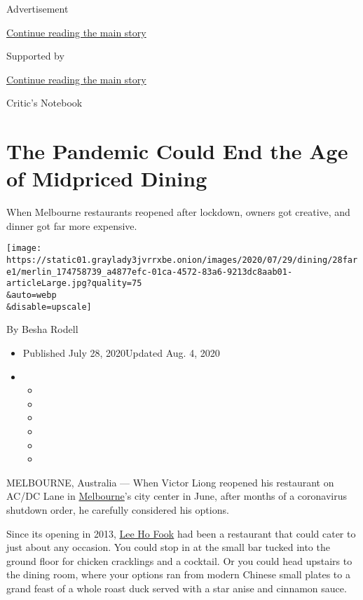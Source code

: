 Advertisement

\protect\hyperlink{after-top}{Continue reading the main story}

Supported by

\protect\hyperlink{after-sponsor}{Continue reading the main story}

Critic's Notebook

\hypertarget{the-pandemic-could-end-the-age-of-midpriced-dining}{%
\section{The Pandemic Could End the Age of Midpriced
Dining}\label{the-pandemic-could-end-the-age-of-midpriced-dining}}

When Melbourne restaurants reopened after lockdown, owners got creative,
and dinner got far more expensive.

\texttt{[image: https://static01.graylady3jvrrxbe.onion/images/2020/07/29/dining/28fare1/merlin\_174758739\_a4877efc-01ca-4572-83a6-9213dc8aab01-articleLarge.jpg?quality=75\\\&auto=webp\\\&disable=upscale]}

By Besha Rodell

\begin{itemize}
\item
  Published July 28, 2020Updated Aug. 4, 2020
\item
  \begin{itemize}
  \item
  \item
  \item
  \item
  \item
  \item
  \end{itemize}
\end{itemize}

MELBOURNE, Australia --- When Victor Liong reopened his restaurant on
AC/DC Lane in
\href{https://www.nytimes3xbfgragh.onion/2020/08/04/world/australia/coronavirus-melbourne-lockdown.html}{Melbourne}'s
city center in June, after months of a coronavirus shutdown order, he
carefully considered his options.

Since its opening in 2013, \href{https://www.leehofook.com.au/}{Lee Ho
Fook} had been a restaurant that could cater to just about any occasion.
You could stop in at the small bar tucked into the ground floor for
chicken cracklings and a cocktail. Or you could head upstairs to the
dining room, where your options ran from modern Chinese small plates to
a grand feast of a whole roast duck served with a star anise and
cinnamon sauce.

